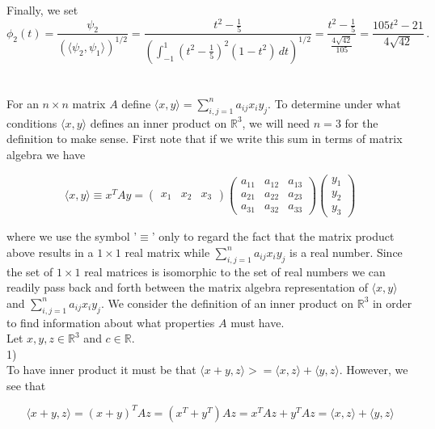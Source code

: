 \documentclass[11pt]{article}
\begin{document}
Finally, we set $$\phi_2(t) = \frac{\psi_2}{(\langle \psi_2, \psi_1\rangle)^{1/2}} = \frac{t^2 - \frac{1}{5}}{\left(\int_{-1}^1 (t^2-\frac{1}{5})^2(1-t^2) \, dt \right)^{1/2}} = \frac{t^2 - \frac{1}{5}}{\frac{4\sqrt{42}}{105}} = \frac{105t^2 - 21}{4\sqrt{42}}\,.$$

\section{}

For an $n\times n$ matrix $A$ define $\langle x, y \rangle = \sum_{i,j = 1}^n a_{ij}x_iy_j$. To determine under what conditions $\langle x, y\rangle$ defines an inner product on $\mathbb{R}^3$, we will need $n = 3$ for the definition to make sense. First note that if we write this sum in terms of matrix algebra we have

$$ \langle x, y \rangle \equiv x^TAy = \begin{pmatrix} x_1& x_2& x_3\end{pmatrix}\begin{pmatrix}
a_{11} & a_{12} & a_{13} \\ a_{21} & a_{22} & a_{23} \\ a_{31} & a_{32} & a_{33} \end{pmatrix}\begin{pmatrix}
y_1 \\ y_2 \\ y_3 \end{pmatrix}$$

where we use the symbol '$\equiv$' only to regard the fact that the matrix product above results in a $1\times 1$ real matrix while $\sum_{i,j = 1}^n a_{ij}x_iy_j$ is a real number. Since the set of $1\times 1$ real matrices is isomorphic to the set of real numbers we can readily pass back and forth between the matrix algebra representation of $\langle x, y \rangle$ and $\sum_{i,j = 1}^n a_{ij}x_iy_j$. We consider the definition of an inner product on $\mathbb{R}^3$ in order to find information about what properties $A$ must have.\\

Let $x,y,z \in \mathbb{R}^3$ and $c \in \mathbb{R}$. \\

1)\\

To have inner product it must be that $\langle x+y, z \rangle> = \langle x,z \rangle + \langle y, z \rangle$. However, we see that

$$\langle x+y, z \rangle = (x+y)^TAz = (x^T + y^T)Az = x^TAz+y^TAz = \langle x,z \rangle + \langle y, z \rangle$$
\end{document}
